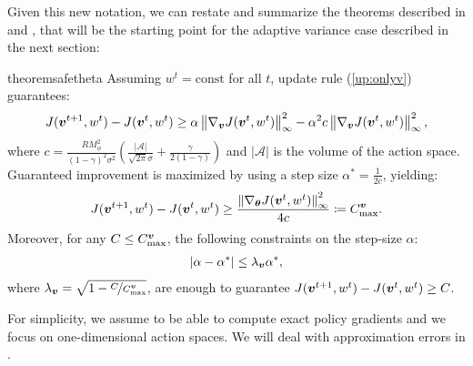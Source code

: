 Given this new notation, we can restate and summarize the theorems described in  and , that will be the starting point for the adaptive variance case described in the next section:
\begin{restatable}{theorem}{safetheta}\label{th:safetheta}
	Assuming $w^t = \text{const} $ for all $t$, update rule (\ref{up:onlyv}) guarantees:
	\begin{align}\label{stat:1_1}
	J(\vv^{t+1}, w^t) - J(\vv^t, w^t) \geq \alpha\norm[\infty]{\gradJ[\vv]{\vv^t,w^t}}^2 - 
	\alpha^2 c \norm[\infty]{\gradJ[\vv]{\vv^t,w^t}}^2,
	\end{align}
	where $c = \frac{RM_{\phi}^2}{(1-\gamma)^2\sigma^2}\left(\frac{|\mathcal{A}|}{\sqrt{2\pi}\sigma} +	\frac{\gamma}{2(1-\gamma)}\right)$ and  $|\mathcal{A}|$ is the volume of the action space. Guaranteed improvement is maximized by using a step size $\alpha^* = \frac{1}{2c}$, yielding:
	\begin{align}\label{stat:1_2}
	J(\vv^{t+1},w^t) - J(\vv^t,w^t) \geq \frac{\norm[\infty]{\gradJ{\vv^t,w^t}}^2}{4c}
	\coloneqq C_{\text{max}}^{\vv}.
	\end{align}
	Moreover, for any $C\leq C_{\text{max}}^{\vv}$, the following constraints on the step-size $\alpha$:
	\begin{align}\label{stat:1_3}
	|\alpha - \alpha^*| \leq \lambda_{\vv}\alpha^*, 
	\end{align}
	where $\lambda_{\vv}=\sqrt{1 - \nicefrac{C}{C_{\text{max}}^{\vv}}}$, are enough to guarantee $J(\vv^{t+1},w^t) - J(\vv^t,w^t)\geq C$.
\end{restatable}

For simplicity, we assume to be able to compute exact policy gradients and we focus on one-dimensional action spaces. We will deal with approximation errors in .

